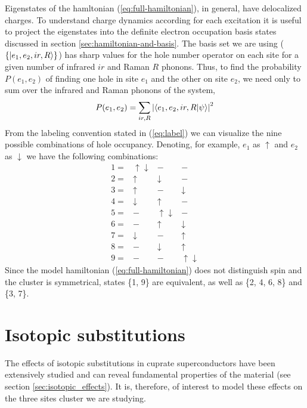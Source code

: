 Eigenstates of the hamltonian (\ref{eq:full-hamiltonian}), in general, have delocalized charges.
To understand charge dynamics according for each excitation it is useful to project the eigenstates into the definite electron occupation basis states discussed in section \ref{sec:hamiltonian-and-basis}.
The basis set we are using ($\{\left | e_1,e_2,ir,R \right\rangle\}$) has sharp values for the hole number operator on each site for a given number of infrared $ir$ and Raman $R$ phonons. 
Thus, to find the probability $P(e_1,e_2)$ of finding one hole in site $e_1$ and the other on site $e_2$, we need only to sum over the infrared and Raman phonons of the system,
%
\begin{equation}
  \label{eq:electron-occupation}
  P(e_1,e_2)=\sum_{ir,R} \left| \left\langle e_1,e_2,ir,R|\psi\right\rangle \right|^2
\end{equation}
%
From the labeling convention stated in (\ref{eq:label}) we can visualize the nine possible combinations of hole occupancy. 
Denoting, for example, $e_1$ as $\uparrow$ and $e_2$ as $\downarrow$ we have the following combinations:
%
\begin{equation}
  \label{eq:basis-set}
  \begin{array}{cccc}
    1= & \uparrow \downarrow & - & - \\
    2= & \uparrow & \downarrow & - \\
    3= & \uparrow & - & \downarrow \\
    4= & \downarrow & \uparrow & - \\
    5= & - & \uparrow \downarrow & - \\
    6= & - & \uparrow & \downarrow \\
    7= & \downarrow & - & \uparrow \\
    8= & - & \downarrow & \uparrow \\
    9= & - & - & \uparrow \downarrow 
  \end{array}
\end{equation}
%
Since the model hamiltonian (\ref{eq:full-hamiltonian}) does not distinguish spin and the cluster is symmetrical, states \{1, 9\} are equivalent, as well as \{2, 4, 6, 8\} and \{3, 7\}.

\section{Isotopic substitutions}
\label{sec:isotopic-model}

The effects of isotopic substitutions in cuprate superconductors have been extensively studied and can reveal fundamental properties of the material (see section \ref{sec:isotopic_effects}). 
It is, therefore, of interest to model these effects on the three sites cluster we are studying.

